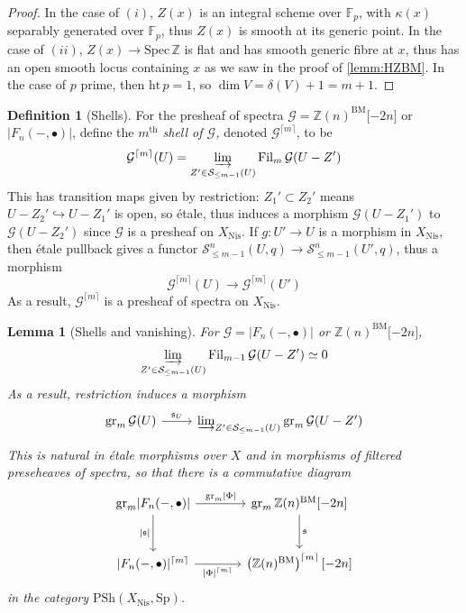 \documentclass[11pt, twoside]{article}
\numberwithin{equation}{section}
\newtheorem{lemma}[equation]{Lemma}
\theoremstyle{definition}
\newtheorem{definition}[equation]{Definition}
\newcommand{\bb}[1]{\mathbb{#1}}
\newcommand{\colim}{\varinjlim}
\newcommand{\spec}{\mathrm{Spec} \,}
\newcommand{\mf}[1]{\mathfrak{#1}}
\newcommand{\fil}{\mathrm{Fil}}
\newcommand{\gr}{\mathrm{gr}}
\newcommand{\Sp}{\mathrm{Sp}}
\newcommand{\bm}{\mathrm{BM}}
\newcommand{\psh}{\mathrm{PSh}}
\newcommand{\nis}{\mathrm{Nis}}
\begin{document}
\begin{proof}
In the case of \((i)\), \(Z(x)\) is an integral scheme over \(\bb{F}_p\), with \(\kappa(x)\) separably generated over \(\bb{F}_p\), thus \(Z(x)\) is smooth at its generic point. In the case of \((ii)\), \(Z(x) \to \spec \bb{Z}\) is flat and has smooth generic fibre at \(x\), thus has an open smooth locus containing \(x\) as we saw in the proof of \ref{lemm:HZBM}. In the case of \(p\) prime, then \(\mathrm{ht} \, p = 1\), so \(\dim V = \delta(V) + 1 = m + 1\).
\end{proof}

\begin{definition}[Shells]
For the presheaf of spectra \(\mathcal{G} = \bb{Z}(n)^\bm \lbrack -2n \rbrack\) or \(|F_n( -, \bullet)|\), define the \emph{\(m^\mathrm{th}\) shell of \(\mathcal{G}\),} denoted \(\mathcal{G}^{\lceil m \rceil}\), to be 
\[\mathcal{G}^{\lceil m \rceil}(U) = \colim_{Z' \in \mathcal{S}_{\leq m - 1}(U)} \fil_m \, \mathcal{G}(U - Z')\]
This has transition maps given by restriction: \(Z_1' \subset Z_2'\) means \(U - Z_2' \hookrightarrow U - Z_1'\) is open, so étale, thus induces a morphism \(\mathcal{G}(U - Z_1')\) to \(\mathcal{G}(U - Z_2')\) since \(\mathcal{G}\) is a presheaf on \(X_\nis\). If \(g \colon U' \to U\) is a morphism in \(X_\nis\), then étale pullback gives a functor \(\mathcal{S}_{\leq m - 1}^n(U, q) \to \mathcal{S}_{\leq m - 1}^n(U', q)\), thus a morphism 
\[\mathcal{G}^{\lceil m \rceil}(U) \to \mathcal{G}^{\lceil m \rceil}(U')\]
As a result, \(\mathcal{G}^{\lceil m \rceil}\) is a presheaf of spectra on \(X_\nis\).
\end{definition}

\begin{lemma}[Shells and vanishing]
For \(\mathcal{G} = |F_n( -, \bullet)|\) or \(\bb{Z}(n)^\bm\lbrack -2n \rbrack\), 
\[\colim_{Z' \in \mathcal{S}_{\leq m - 1}(U)} \fil_{m - 1} \, \mathcal{G}(U - Z') \simeq 0\]
As a result, restriction induces a morphism  
\[\begin{tikzcd}
\gr_m \, \mathcal{G}(U) \ar[r, "\mf{s}_U"] & \colim_{Z' \in \mathcal{S}_{\leq m - 1}(U)} \gr_m \, \mathcal{G}(U - Z')
\end{tikzcd}\]
This is natural in étale morphisms over \(X\) and in morphisms of filtered preseheaves of spectra, so that there is a commutative diagram 
\begin{equation}\label{eq:niv-shell}
\begin{tikzcd} [row sep = large, column sep = large]
\gr_m |F_n( -, \bullet)| \ar[d, "\lvert \mf{s} \rvert", swap] \ar[r, "\gr_m |\Phi|"] & \gr_m \, \bb{Z}(n)^\bm\lbrack -2n \rbrack \ar[d, "\mf{s}"]\\
\lvert F_n( -, \bullet)\rvert^{\lceil m \rceil} \ar[r, "|\Phi|^{\lceil m \rceil}"'] & \left(\bb{Z}(n)^\bm\right)^{\lceil m \rceil}\lbrack -2n \rbrack
\end{tikzcd}
\end{equation}
in the category \(\psh(X_\nis, \Sp)\).
\end{lemma}
\end{document}

